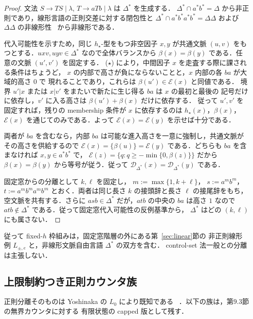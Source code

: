 \documentclass[11pt,a4paper]{ltjsarticle}
\theoremstyle{remark}
\theoremstyle{plain}
\newcommand{\D}{\mathcal{D}}
\begin{document}
\begin{proof}
文法 $S\to TS\mid\lambda$, $T\to aTb\mid\lambda$ は $\Delta^*$ を生成する．
$\Delta^*\cap a^*b^*=\Delta$ から非正則であり，線形言語の正則交差に対する閉包性と
$\Delta^*\cap a^*b^*a^*b^*=\Delta\Delta$
および $\Delta\Delta$ の非線形性~\cite{autebert1997} から非線形である．

代入可能性を示すため，同じ $h_\star$-型をもつ非空因子 $x,y$ が共通文脈
$(u,v)$ をもつとする．$uxv,uyv\in\Delta^*$ なので全体バランスから
$\beta(x)=\beta(y)$ である．任意の文脈 $(u',v')$ を固定する．
\textup{($\star$)} により，中間因子 $x$ を走査する際に課される条件はちょうど，
$x$ の内部で高さが負にならないことと，$x$ 内部の各 $ba$ が大域的高さ $0$ で
現れることであり，これらは $\beta(u')\in\mathcal E(x)$ と同値である．
境界 $u'|x$ または $x|v'$ をまたいで新たに生じ得る $ba$ は $x$ の最初と最後の
記号だけに依存し，$v'$ に入る高さは $\beta(u')+\beta(x)$ だけに依存する．
従って $u',v'$ を固定すれば，残りの membership 条件が $x$ に依存するのは
$h_\star(x)$，$\beta(x)$，$\mathcal E(x)$ を通じてのみである．よって
$\mathcal E(x)=\mathcal E(y)$ を示せば十分である．

両者が $ba$ を含むなら，内部 $ba$ は可能な進入高さを一意に強制し，共通文脈が
その高さを供給するので
$\mathcal E(x)=\{\beta(u)\}=\mathcal E(y)$ である．どちらも $ba$ を含まなければ
$x,y\in a^*b^*$ で，
$\mathcal E(z)=\{q:q\ge-\min\{0,\beta(z)\}\}$ だから
$\beta(x)=\beta(y)$ から等号が従う．従って
$\D_{\Delta^*}(x)=\D_{\Delta^*}(y)$ である．

固定窓からの分離として $k,\ell$ を固定し，
$m:=\max\{1,k+\ell\}$，
$s:=a^mb^m$，
$t:=a^mb^ma^mb^m$ とおく．両者は同じ長さ $k$ の接頭辞と長さ $\ell$ の接尾辞をもち，
空文脈を共有する．さらに $asb\in\Delta^*$ だが，$atb$ の中央の $ba$ は高さ $1$
なので $atb\notin\Delta^*$ である．従って固定窓代入可能性の反例基準から，
$\Delta^*$ はどの $(k,\ell)$ にも属さない．
\end{proof}

従って fixed-$h$ 枠組みは，固定窓階層の外にある第~\ref{sec:linear}節の
非正則線形例 $L_{\pm,e}$ と，非線形文脈自由言語 $\Delta^*$ の双方を含む．
control-set 法一般との分離は主張しない．

\subsection{上限制約つき正則カウンタ族}

正則分離そのものは Yoshinaka の $L_0$ により既知である
~\cite[Proposition~1]{yoshinaka2008}．以下の族は，第9.3節の無界カウンタに対する
有限状態の capped 版として残す．
\end{document}
